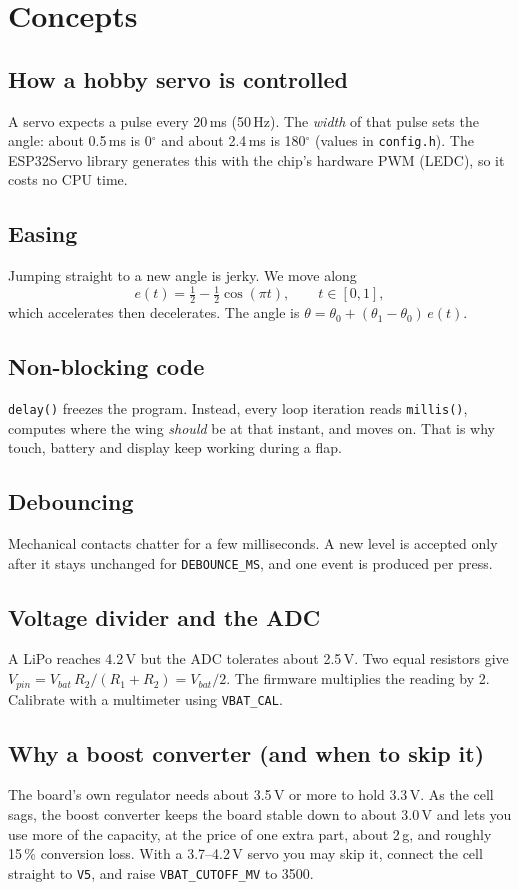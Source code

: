 \documentclass[11pt,a4paper]{article}
\begin{document}
\section{Concepts}
\subsection{How a hobby servo is controlled}
A servo expects a pulse every 20\,ms (50\,Hz). The \emph{width} of that pulse sets the angle:
about 0.5\,ms is 0$^\circ$ and about 2.4\,ms is 180$^\circ$ (values in \texttt{config.h}). The ESP32Servo
library generates this with the chip's hardware PWM (LEDC), so it costs no CPU time.

\subsection{Easing}
Jumping straight to a new angle is jerky. We move along
\[ e(t) = \tfrac12 - \tfrac12\cos(\pi t), \qquad t\in[0,1], \]
which accelerates then decelerates. The angle is $\theta = \theta_0 + (\theta_1-\theta_0)\,e(t)$.

\subsection{Non-blocking code}
\texttt{delay()} freezes the program. Instead, every loop iteration reads \texttt{millis()}, computes where
the wing \emph{should} be at that instant, and moves on. That is why touch, battery and display keep working during a flap.

\subsection{Debouncing}
Mechanical contacts chatter for a few milliseconds. A new level is accepted only after it stays unchanged for
\texttt{DEBOUNCE\_MS}, and one event is produced per press.

\subsection{Voltage divider and the ADC}
A LiPo reaches 4.2\,V but the ADC tolerates about 2.5\,V. Two equal resistors give
$V_{pin}=V_{bat}\,R_2/(R_1+R_2)=V_{bat}/2$. The firmware multiplies the reading by 2. Calibrate with a multimeter
using \texttt{VBAT\_CAL}.

\subsection{Why a boost converter (and when to skip it)}
The board's own regulator needs about 3.5\,V or more to hold 3.3\,V. As the cell sags, the boost converter keeps
the board stable down to about 3.0\,V and lets you use more of the capacity, at the price of one extra part,
about 2\,g, and roughly 15\,\% conversion loss. With a 3.7--4.2\,V servo you may skip it, connect the cell
straight to \texttt{V5}, and raise \texttt{VBAT\_CUTOFF\_MV} to 3500.
\end{document}
